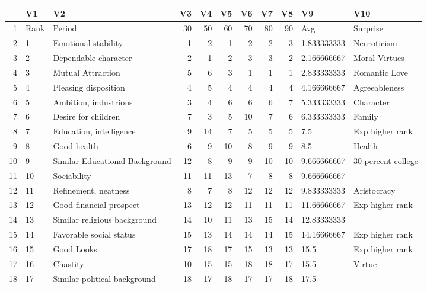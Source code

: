 \documentclass{article}
\begin{document}
\begin{table}[ht]
\centering
\begin{tabular}{rllrrrrrrll}
  \hline
 & V1 & V2 & V3 & V4 & V5 & V6 & V7 & V8 & V9 & V10 \\ 
  \hline
1 & Rank & Period &  30 &  50 &  60 &  70 &  80 &  90 & Avg & Surprise \\ 
  2 & 1 & Emotional stability &   1 &   2 &   1 &   2 &   2 &   3 & 1.833333333 & Neuroticism \\ 
  3 & 2 & Dependable character &   2 &   1 &   2 &   3 &   3 &   2 & 2.166666667 & Moral Virtues \\ 
  4 & 3 & Mutual Attraction &   5 &   6 &   3 &   1 &   1 &   1 & 2.833333333 & Romantic Love \\ 
  5 & 4 & Pleasing disposition &   4 &   5 &   4 &   4 &   4 &   4 & 4.166666667 & Agreeableness \\ 
  6 & 5 & Ambition, industrious &   3 &   4 &   6 &   6 &   6 &   7 & 5.333333333 & Character  \\ 
  7 & 6 & Desire for children &   7 &   3 &   5 &  10 &   7 &   6 & 6.333333333 & Family \\ 
  8 & 7 & Education, intelligence &   9 &  14 &   7 &   5 &   5 &   5 & 7.5 & Exp higher rank \\ 
  9 & 8 & Good health &   6 &   9 &  10 &   8 &   9 &   9 & 8.5 & Health \\ 
  10 & 9 & Similar Educational Background &  12 &   8 &   9 &   9 &  10 &  10 & 9.666666667 & 30 percent college \\ 
  11 & 10 & Sociability &  11 &  11 &  13 &   7 &   8 &   8 & 9.666666667 &  \\ 
  12 & 11 & Refinement, neatness &   8 &   7 &   8 &  12 &  12 &  12 & 9.833333333 & Aristocracy \\ 
  13 & 12 & Good financial prospect &  13 &  12 &  12 &  11 &  11 &  11 & 11.66666667 & Exp higher rank \\ 
  14 & 13 & Similar religious background &  14 &  10 &  11 &  13 &  15 &  14 & 12.83333333 &  \\ 
  15 & 14 & Favorable social status &  15 &  13 &  14 &  14 &  14 &  15 & 14.16666667 & Exp higher rank \\ 
  16 & 15 & Good Looks &  17 &  18 &  17 &  15 &  13 &  13 & 15.5 & Exp higher rank \\ 
  17 & 16 & Chastity &  10 &  15 &  15 &  18 &  18 &  17 & 15.5 & Virtue \\ 
  18 & 17 & Similar political background &  18 &  17 &  18 &  17 &  17 &  18 & 17.5 &  \\ 
   \hline
\end{tabular}
\end{table}
\end{document}
